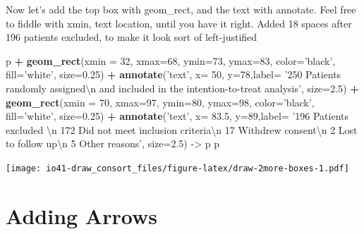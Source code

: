 \documentclass[
]{book}
\newenvironment{Shaded}{\begin{snugshade}}{\end{snugshade}}
\newcommand{\CharTok}[1]{\textcolor[rgb]{0.31,0.60,0.02}{#1}}
\newcommand{\DataTypeTok}[1]{\textcolor[rgb]{0.13,0.29,0.53}{#1}}
\newcommand{\DecValTok}[1]{\textcolor[rgb]{0.00,0.00,0.81}{#1}}
\newcommand{\FloatTok}[1]{\textcolor[rgb]{0.00,0.00,0.81}{#1}}
\newcommand{\KeywordTok}[1]{\textcolor[rgb]{0.13,0.29,0.53}{\textbf{#1}}}
\newcommand{\NormalTok}[1]{#1}
\newcommand{\OperatorTok}[1]{\textcolor[rgb]{0.81,0.36,0.00}{\textbf{#1}}}
\newcommand{\StringTok}[1]{\textcolor[rgb]{0.31,0.60,0.02}{#1}}
\begin{document}
Now let's add the top box with geom\_rect, and the text with annotate.
Feel free to fiddle with xmin, text location, until you have it right.
Added 18 spaces after 196 patients excluded, to make it look sort of left-justified

\begin{Shaded}
\begin{Highlighting}[]
\NormalTok{p }\OperatorTok{+}
\StringTok{  }\KeywordTok{geom_rect}\NormalTok{(}\DataTypeTok{xmin =} \DecValTok{32}\NormalTok{, }\DataTypeTok{xmax=}\DecValTok{68}\NormalTok{, }\DataTypeTok{ymin=}\DecValTok{73}\NormalTok{, }\DataTypeTok{ymax=}\DecValTok{83}\NormalTok{, }\DataTypeTok{color=}\StringTok{'black'}\NormalTok{,}
            \DataTypeTok{fill=}\StringTok{'white'}\NormalTok{, }\DataTypeTok{size=}\FloatTok{0.25}\NormalTok{) }\OperatorTok{+}
\StringTok{  }\KeywordTok{annotate}\NormalTok{(}\StringTok{'text'}\NormalTok{, }\DataTypeTok{x=} \DecValTok{50}\NormalTok{, }\DataTypeTok{y=}\DecValTok{78}\NormalTok{,}\DataTypeTok{label=} \StringTok{'250 Patients randomly assigned}\CharTok{\textbackslash{}n}\StringTok{ and included in the intention-to-treat analysis'}\NormalTok{, }\DataTypeTok{size=}\FloatTok{2.5}\NormalTok{) }\OperatorTok{+}
\StringTok{  }\KeywordTok{geom_rect}\NormalTok{(}\DataTypeTok{xmin =} \DecValTok{70}\NormalTok{, }\DataTypeTok{xmax=}\DecValTok{97}\NormalTok{, }\DataTypeTok{ymin=}\DecValTok{80}\NormalTok{, }\DataTypeTok{ymax=}\DecValTok{98}\NormalTok{, }\DataTypeTok{color=}\StringTok{'black'}\NormalTok{,}
            \DataTypeTok{fill=}\StringTok{'white'}\NormalTok{, }\DataTypeTok{size=}\FloatTok{0.25}\NormalTok{) }\OperatorTok{+}
\StringTok{  }\KeywordTok{annotate}\NormalTok{(}\StringTok{'text'}\NormalTok{, }\DataTypeTok{x=} \FloatTok{83.5}\NormalTok{, }\DataTypeTok{y=}\DecValTok{89}\NormalTok{,}\DataTypeTok{label=} \StringTok{'196 Patients excluded                 }\CharTok{\textbackslash{}n}\StringTok{ 172 Did not meet inclusion criteria}\CharTok{\textbackslash{}n}\StringTok{ 17 Withdrew consent}\CharTok{\textbackslash{}n}\StringTok{ 2 Lost to follow up}\CharTok{\textbackslash{}n}\StringTok{ 5 Other reasons'}\NormalTok{, }\DataTypeTok{size=}\FloatTok{2.5}\NormalTok{) ->}
\StringTok{  }\NormalTok{p}
\NormalTok{p}
\end{Highlighting}
\end{Shaded}

\texttt{[image: io41-draw\_consort\_files/figure-latex/draw-2more-boxes-1.pdf]}

\hypertarget{adding-arrows}{%
\section{Adding Arrows}\label{adding-arrows}}
\end{document}
